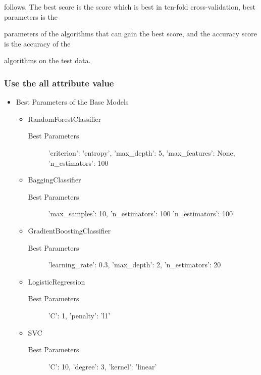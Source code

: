 follows. The best score is the score which is best in ten-fold cross-validation, best parameters is the 

parameters of the algorithms that can gain the best score, and the accuracy score is the accuracy of the 

algorithms on the test data. 

\subsubsection[Train_Data_1]{Use the all attribute value}

\begin{itemize}
	\item Best Parameters of the Base Models
	
	\begin{itemize}
		\item RandomForestClassifier
		
		\begin{description}
			\item[Best Parameters] 'criterion': 'entropy', 'max_depth': 5, 'max_features': None, 'n_estimators': 100
		\end{description}
		
		\item BaggingClassifier
		
		\begin{description}
			\item[Best Parameters] 'max_samples': 10, 'n_estimators': 100 'n_estimators': 100
		\end{description}
		
		\item GradientBoostingClassifier
		
		\begin{description}
			\item[Best Parameters] 'learning_rate': 0.3, 'max_depth': 2, 'n_estimators': 20
		\end{description}
		
		\item LogisticRegression
		
		\begin{description}
			\item[Best Parameters] 'C': 1, 'penalty': 'l1'
		\end{description}
		
		\item SVC
		
		\begin{description}
			\item[Best Parameters] 'C': 10, 'degree': 3, 'kernel': 'linear'
		\end{description}
		

\end{itemize}
\end{itemize}
